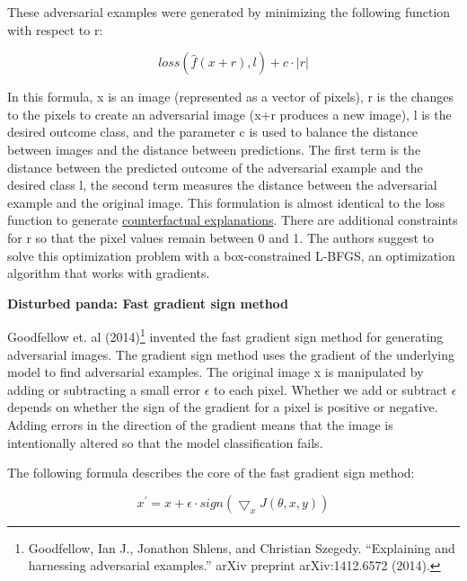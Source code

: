 \documentclass[
  12pt,
]{krantz}
\begin{document}
These adversarial examples were generated by minimizing the following function with respect to r:

\[loss(\hat{f}(x+r),l)+c\cdot|r|\]

In this formula, x is an image (represented as a vector of pixels), r is the changes to the pixels to create an adversarial image (x+r produces a new image), l is the desired outcome class, and the parameter c is used to balance the distance between images and the distance between predictions.
The first term is the distance between the predicted outcome of the adversarial example and the desired class l, the second term measures the distance between the adversarial example and the original image.
This formulation is almost identical to the loss function to generate \protect\hyperlink{counterfactual}{counterfactual explanations}.
There are additional constraints for r so that the pixel values remain between 0 and 1.
The authors suggest to solve this optimization problem with a box-constrained L-BFGS, an optimization algorithm that works with gradients.

\textbf{Disturbed panda: Fast gradient sign method}

Goodfellow et. al (2014)\footnote{Goodfellow, Ian J., Jonathon Shlens, and Christian Szegedy. ``Explaining and harnessing adversarial examples.'' arXiv preprint arXiv:1412.6572 (2014).} invented the fast gradient sign method for generating adversarial images.
The gradient sign method uses the gradient of the underlying model to find adversarial examples.
The original image x is manipulated by adding or subtracting a small error \(\epsilon\) to each pixel.
Whether we add or subtract \(\epsilon\) depends on whether the sign of the gradient for a pixel is positive or negative.
Adding errors in the direction of the gradient means that the image is intentionally altered so that the model classification fails.

The following formula describes the core of the fast gradient sign method:

\[x^\prime=x+\epsilon\cdot{}sign(\bigtriangledown_x{}J(\theta,x,y))\]
\end{document}

